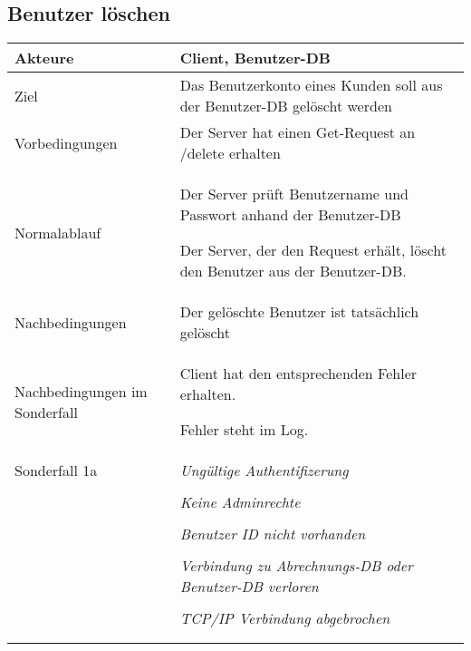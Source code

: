 \documentclass[a4paper,10pt,titlepage,parskip=true]{article}
\makeatletter
\newcommand\novspace{\@minipagetrue}
\newenvironment{owncompactitem}{%
\compactitem
}{%
\@finalstrut\@arstrutbox
\@nameuse{endcompactitem}%
\aftergroup\let\aftergroup\@finalstrut\aftergroup\@gobble
}
\newenvironment{owncompactenum}{%
\compactenum
}{%
\@finalstrut\@arstrutbox
\@nameuse{endcompactenum}%
\aftergroup\let\aftergroup\@finalstrut\aftergroup\@gobble
}
\newcommand{\usecase}[7]
{\subsection{#1}
\setlength{\extrarowheight}{2pt}
\begin{tabular}{|p{0.2\textwidth}|p{0.9\textwidth}|}
\hline
  Akteure & #2\\\hline
  Ziel & #3\\\hline
  Vorbedingungen & \novspace
  	\begin{owncompactitem}[-] #4 \end{owncompactitem} \\\hline
  Normalablauf & \vspace{-7pt}
  	\begin{owncompactenum}[1.] #6 \end{owncompactenum} \\\hline
  Nachbedingungen & \novspace
  	\begin{owncompactitem}[-] #5 \end{owncompactitem} \\\hline
  #7
\end{tabular}
}
\newcommand{\sonderfall}[4][\empty]
{
Sonderfall #2 & \vspace{-10pt}
	\textit{#3}
	\begin{owncompactenum}[{#2}.1] {#4} \end{owncompactenum}
  	\ifthenelse{\equal{#1}{\empty}}
    	{\\\hline} %
    	{\ensuremath{\rightarrow} #1 \\ [+1pt] \hline} %

}
\newcommand{\sondernachbedingung}[1]
{
Nachbedingungen im Sonderfall& \novspace
	\begin{owncompactitem}[-]
		#1
	\end{owncompactitem} \\\hline
}
\makeatother
\begin{document}
\usecase{Benutzer löschen}{Client, Benutzer-DB}%
{Das Benutzerkonto eines Kunden soll aus der Benutzer-DB gelöscht werden}%
{%
  \item Der Server hat einen Get-Request an /delete erhalten
}
{%
  \item Der gelöschte Benutzer ist tatsächlich gelöscht
}
{%
  \item Der Server prüft Benutzername und Passwort anhand der Benutzer-DB
  \item Der Server, der den Request erhält, löscht den Benutzer aus der Benutzer-DB.
}
{%
  \sondernachbedingung{
	\item Client hat den entsprechenden Fehler erhalten.
	\item Fehler steht im Log.
	}
		\sonderfall[Weiter mit normalem Betrieb]{1a}
    {Ungültige Authentifizerung}
    {
    \item Fehler wird ins Log geschrieben
  	\item Der Client erhält einen EAUTH Fehler mit HTTP-Status 401 Unauthorized
    }
    
  	\sonderfall[Weiter mit normalem Betrieb]{1b}
    {Keine Adminrechte}
    {
    \item Fehler wird ins Log geschrieben
  	\item Der Client erhält einen ENOTADMIN Fehler mit HTTP-Status 403 Forbidden
    }
    
  	\sonderfall[Weiter mit normalem Betrieb]{1c}
    {Benutzer ID nicht vorhanden}
    {
    \item Fehler wird ins Log geschrieben
  	\item Der Client erhält einen ENOID Fehler mit HTTP-Status 404 Not Found
    }

  \sonderfall[Der Server nimmt keine weiteren Anfragen an bis Verbindung zur Datenbank wieder hergestellt.]{*}%
	{Verbindung zu Abrechnungs-DB oder Benutzer-DB verloren}%
  	{
	\item Der Fehler wird ins Log geschrieben
	\item Der Client erhält einen EDATABASE Fehler mit HTTP-Status 503 Service Unavailable
  	}

\sonderfall[Weiter mit normalem Betrieb]{**}%
	{TCP/IP Verbindung abgebrochen}%
	{
	\item Fehlermeldung wird ins Log geschrieben
	}
}
\end{document}
